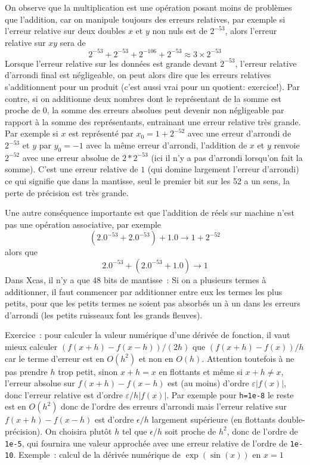 \documentclass[a4paper,11pt]{book}
\begin{document}
\begin{giacjshere}
On observe que la multiplication est une opération posant moins
de problèmes que l'addition, car on manipule toujours des erreurs
relatives, par exemple si l'erreur relative sur deux doubles
$x$ et $y$ non nuls
est de $2^{-53}$, alors l'erreur relative sur $xy$ sera de 
\[ 2^{-53} + 2^{-53} + 2^{-106} + 2^{-53} \approx 3 \times 2^{-53} \]
Lorsque l'erreur relative sur les données est grande devant $2^{-53}$,
l'erreur relative d'arrondi final est négligeable, on peut alors dire que
les erreurs relatives s'additionnent pour un produit (c'est aussi vrai
pour un quotient: exercice!).
Par contre, si on additionne deux nombres dont le représentant de
la somme est proche de 0, la somme des erreurs absolues peut
devenir non négligeable par rapport à la somme des représentants, entrainant
une erreur relative très grande. Par exemple si $x$ est représenté
par $x_0=1+2^{-52}$ avec
une erreur d'arrondi de $2^{-53}$ et
$y$ par $y_0=-1$ avec la même erreur d'arrondi, 
l'addition de $x$ et $y$ renvoie $2^{-52}$ avec une erreur
absolue de $2 * 2^{-53}$ (ici il n'y a pas d'arrondi lorsqu'on fait la somme).
C'est une erreur relative de $1$ (qui domine largement
l'erreur d'arrondi) ce qui signifie que dans la mantisse, seul le
premier bit sur les 52 a un sens, la perte de précision est très grande.

Une autre conséquence importante est que l'addition de réels sur machine
n'est pas une opération associative,
par exemple
\[ (2.0^{-53}+2.0^{-53})+1.0 \rightarrow 1+2^{-52} \]
alors que
\[ 2.0^{-53}+(2.0^{-53}+1.0) \rightarrow 1 \]
Dans Xcas, il n'y a que 48 bits de mantisse~:
Si on a plusieurs termes
à additionner, il faut commencer par additionner entre eux
les termes les plus petits, pour que les petits termes ne soient
pas absorbés un à un dans les erreurs d'arrondi (les petits ruisseaux
font les grands fleuves).

Exercice~: pour calculer la valeur
num\'erique d'une d\'eriv\'ee de fonction, il vaut mieux
calculer $(f(x+h)-f(x-h))/(2h)$ que $(f(x+h)-f(x))/h$ car le terme
d'erreur est en $O(h^2)$ et non en $O(h)$. Attention
toutefois \`a ne pas prendre $h$ trop petit, sinon $x+h=x$
en flottants et m\^eme si $x+h \neq x$, l'erreur absolue sur
$f(x+h)-f(x-h)$ est (au moins) d'ordre $\varepsilon |f(x)|$, donc l'erreur
relative est d'ordre $\varepsilon/h |f(x)|$. 
Par exemple pour {\tt h=1e-8} le reste est en $O(h^2)$ donc
de l'ordre des erreurs d'arrondi mais l'erreur relative sur
$f(x+h)-f(x-h)$ est d'ordre $\epsilon/h$ largement sup\'erieure
(en flottants double-pr\'ecision). On choisira plut\^ot $h$ tel que
$\epsilon/h$ soit proche de $h^2$, donc de l'ordre de {\tt 1e-5}, qui
fournira une valeur approch\'ee avec une erreur relative de l'ordre
de {\tt 1e-10}.
Exemple~: calcul de la d\'eriv\'ee num\'erique de $\exp(\sin(x))$ en $x=1$


\end{giacjshere}
\end{document}
